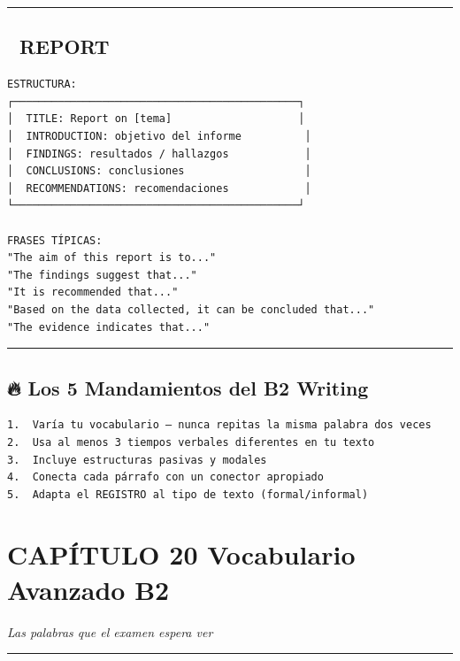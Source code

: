 \documentclass[
  spanish,
  letterpaper,
]{scrbook}
\begin{document}
\begin{center}\rule{0.5\linewidth}{0.5pt}\end{center}

\section{📝 REPORT}\label{report}

\begin{verbatim}
ESTRUCTURA:
┌─────────────────────────────────────────────┐
│  TITLE: Report on [tema]                    │
│  INTRODUCTION: objetivo del informe          │
│  FINDINGS: resultados / hallazgos            │
│  CONCLUSIONS: conclusiones                   │
│  RECOMMENDATIONS: recomendaciones            │
└─────────────────────────────────────────────┘

FRASES TÍPICAS:
"The aim of this report is to..."
"The findings suggest that..."
"It is recommended that..."
"Based on the data collected, it can be concluded that..."
"The evidence indicates that..."
\end{verbatim}

\begin{center}\rule{0.5\linewidth}{0.5pt}\end{center}

\section{🔥 Los 5 Mandamientos del B2
Writing}\label{los-5-mandamientos-del-b2-writing}

\begin{verbatim}
1.  Varía tu vocabulario — nunca repitas la misma palabra dos veces
2.  Usa al menos 3 tiempos verbales diferentes en tu texto
3.  Incluye estructuras pasivas y modales
4.  Conecta cada párrafo con un conector apropiado
5.  Adapta el REGISTRO al tipo de texto (formal/informal)
\end{verbatim}

\chapter{CAPÍTULO 20 Vocabulario Avanzado
B2}\label{capuxedtulo-20-vocabulario-avanzado-b2}

\emph{Las palabras que el examen espera ver}

\begin{center}\rule{0.5\linewidth}{0.5pt}\end{center}
\end{document}
